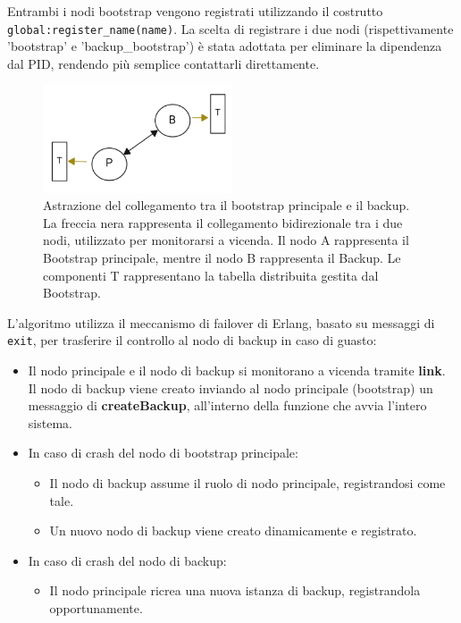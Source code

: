 \documentclass{article}
\begin{document}
Entrambi i nodi bootstrap vengono registrati utilizzando il costrutto \texttt{global:register\_name(name)}. La scelta di registrare i due nodi (rispettivamente 'bootstrap' e 'backup\_bootstrap') è stata adottata per eliminare la dipendenza dal PID, rendendo più semplice contattarli direttamente.

\begin{figure}[htbp] %
    \centering %
    \includegraphics[width=0.50\textwidth]{link.png} %
    \caption{Astrazione del collegamento tra il bootstrap principale e il backup. La freccia nera rappresenta il collegamento bidirezionale tra i due nodi, utilizzato per monitorarsi a vicenda. Il nodo A rappresenta il Bootstrap principale, mentre il nodo B rappresenta il Backup. Le componenti T rappresentano la tabella distribuita gestita dal Bootstrap.} %
    \label{fig:esempio} %
\end{figure}

L'algoritmo utilizza il meccanismo di failover di Erlang, basato su messaggi di \texttt{exit}, per trasferire il controllo al nodo di backup in caso di guasto:
\begin{itemize}
    \item Il nodo principale e il nodo di backup si monitorano a vicenda tramite \textbf{link}. Il nodo di backup viene creato inviando al nodo principale (bootstrap) un messaggio di \textbf{createBackup}, all'interno della funzione che avvia l'intero sistema.
    \item In caso di crash del nodo di bootstrap principale:
    \begin{itemize}
        \item Il nodo di backup assume il ruolo di nodo principale, registrandosi come tale.
        \item Un nuovo nodo di backup viene creato dinamicamente e registrato.
    \end{itemize}
    \item In caso di crash del nodo di backup:
    \begin{itemize}
        \item Il nodo principale ricrea una nuova istanza di backup, registrandola opportunamente.
    \end{itemize}
\end{itemize}
\end{document}
